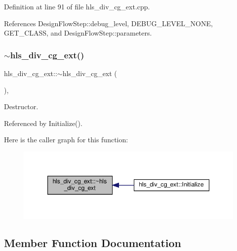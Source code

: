 Definition at line 91 of file hls\+\_\+div\+\_\+cg\+\_\+ext.\+cpp.



References Design\+Flow\+Step\+::debug\+\_\+level, D\+E\+B\+U\+G\+\_\+\+L\+E\+V\+E\+L\+\_\+\+N\+O\+NE, G\+E\+T\+\_\+\+C\+L\+A\+SS, and Design\+Flow\+Step\+::parameters.

\mbox{\label{classhls__div__cg__ext_acfd4c2e4729d910982f064fd49832f6b}} 
\subsubsection{\texorpdfstring{$\sim$hls\+\_\+div\+\_\+cg\+\_\+ext()}{~hls\_div\_cg\_ext()}}
{\footnotesize\ttfamily hls\+\_\+div\+\_\+cg\+\_\+ext\+::$\sim$hls\+\_\+div\+\_\+cg\+\_\+ext (\begin{DoxyParamCaption}{ }\end{DoxyParamCaption})\hspace{0.3cm}{\ttfamily [override]}, {\ttfamily [default]}}



Destructor. 



Referenced by Initialize().

Here is the caller graph for this function\+:
\nopagebreak
\begin{figure}[H]
\begin{center}
\leavevmode
\includegraphics[width=347pt]{de/d52/classhls__div__cg__ext_acfd4c2e4729d910982f064fd49832f6b_icgraph}
\end{center}
\end{figure}


\subsection{Member Function Documentation}
\mbox{\label{classhls__div__cg__ext_a43c44d4fcf081c7084e6112bea0e68bc}} 
